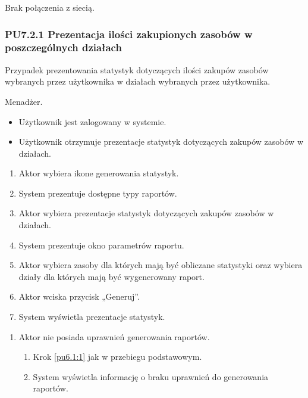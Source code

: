 Brak połączenia z siecią.

\subsubsection{PU7.2.1 Prezentacja ilości zakupionych zasobów w poszczególnych działach}
Przypadek prezentowania statystyk dotyczących ilości zakupów zasobów wybranych przez użytkownika w działach wybranych przez użytkownika.

Menadżer.

\begin{itemize}
\item Użytkownik jest zalogowany w systemie.
\end{itemize}

\begin{itemize}
\item Użytkownik otrzymuje prezentacje statystyk dotyczących zakupów zasobów w działach.
\end{itemize}

\begin{enumerate}
	\item \label{pu7.2.1:1} Aktor wybiera ikone generowania statystyk.
	\item System prezentuje dostępne typy raportów.
	\item \label{pu7.2.1:2} Aktor wybiera prezentacje statystyk dotyczących zakupów zasobów w działach.
	\item System prezentuje okno parametrów raportu.
	\item Aktor wybiera zasoby dla których mają być obliczane statystyki oraz wybiera działy dla których mają być wygenerowany raport.
	\item Aktor wciska przycisk „Generuj”.
	\item System wyświetla prezentacje statystyk.
\end{enumerate}

\begin{enumerate}
	\item Aktor nie posiada uprawnień generowania raportów.
	\begin{enumerate}[label*=\arabic*.]
		\item Krok \ref{pu6.1:1} jak w przebiegu podstawowym.
		\item System wyświetla informację o braku uprawnień do generowania raportów.
	\end{enumerate}
\end{enumerate}

